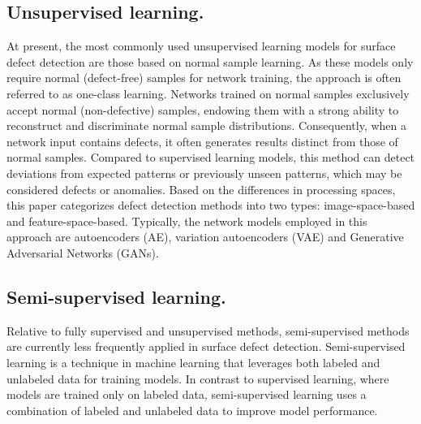 \documentclass[conference]{IEEEtran}
\begin{document}
\subsection{Unsupervised learning.} 

At present, the most commonly used unsupervised learning models for surface defect detection are those based on normal sample learning. As these models only require normal (defect-free) samples for network training, the approach is often referred to as one-class learning. Networks trained on normal samples exclusively accept normal (non-defective) samples, endowing them with a strong ability to reconstruct and discriminate normal sample distributions. Consequently, when a network input contains defects, it often generates results distinct from those of normal samples. Compared to supervised learning models, this method can detect deviations from expected patterns or previously unseen patterns, which may be considered defects or anomalies. Based on the differences in processing spaces, this paper categorizes defect detection methods into two types: image-space-based and feature-space-based. Typically, the network models employed in this approach are autoencoders (AE)\cite{liou2014autoencoder}, variation autoencoders (VAE)\cite{doersch2016tutorial} and Generative Adversarial Networks (GANs)\cite{goodfellow2020generative}.

\subsection{Semi-supervised learning.}

Relative to fully supervised and unsupervised methods, semi-supervised methods are currently less frequently applied in surface defect detection. Semi-supervised learning is a technique in machine learning that leverages both labeled and unlabeled data for training models. In contrast to supervised learning, where models are trained only on labeled data, semi-supervised learning uses a combination of labeled and unlabeled data to improve model performance. 
\end{document}
